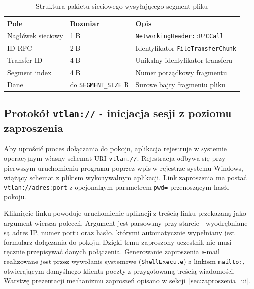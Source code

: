 \begin{table}[H]
    \centering
    \caption{Struktura pakietu sieciowego wysyłającego segment pliku}
    \begin{tabularx}{\textwidth}{|l|l|X|}
        \hline
        \textbf{Pole} & \textbf{Rozmiar} & \textbf{Opis} \\
        \hline
        Nagłówek sieciowy & 1 B & \texttt{NetworkingHeader::RPCCall} \\
        \hline
        ID RPC & 2 B & Identyfikator \texttt{FileTransferChunk} \\
        \hline
        Transfer ID & 4 B & Unikalny identyfikator transferu \\
        \hline
        Segment index & 4 B & Numer porządkowy fragmentu \\
        \hline
        Dane & do \texttt{SEGMENT\_SIZE} B & Surowe bajty fragmentu pliku \\
        \hline
    \end{tabularx}
    \label{tab:chunk_packet}
\end{table}

\subsection*{Protokół \texttt{vtlan://} - inicjacja sesji z poziomu zaproszenia}
\label{subsec:vtlan_uri}

Aby uprościć proces dołączania do pokoju, aplikacja rejestruje w systemie
operacyjnym własny schemat URI \texttt{vtlan://}. Rejestracja odbywa się
przy pierwszym uruchomieniu programu poprzez wpis w rejestrze systemu
Windows, wiążący schemat z plikiem wykonywalnym aplikacji. Link zaproszenia
ma postać \texttt{vtlan://adres:port} z opcjonalnym parametrem
\texttt{pwd=} przenoszącym hasło pokoju.

Kliknięcie linku powoduje uruchomienie aplikacji z treścią linku przekazaną
jako argument wiersza poleceń. Argument jest parsowany przy starcie -
wyodrębniane są adres IP, numer portu oraz hasło, którymi automatycznie
wypełniany jest formularz dołączania do pokoju. Dzięki temu zaproszony
uczestnik nie musi ręcznie przepisywać danych połączenia. Generowanie
zaproszenia e-mail realizowane jest przez wywołanie systemowe
(\texttt{ShellExecute}) z linkiem \texttt{mailto:}, otwierającym domyślnego
klienta poczty z przygotowaną treścią wiadomości. Warstwę prezentacji
mechanizmu zaproszeń opisano w sekcji~\ref{sec:zaproszenia_ui}.


